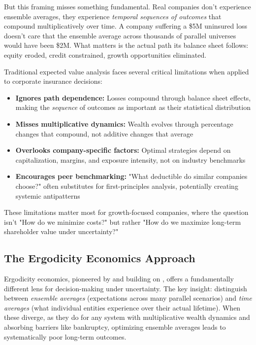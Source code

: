 \documentclass[11pt,letterpaper]{article}
\begin{document}
But this framing misses something fundamental. Real companies don't experience ensemble averages, they experience \emph{temporal sequences of outcomes} that compound multiplicatively over time. A company suffering a \$5M uninsured loss doesn't care that the ensemble average across thousands of parallel universes would have been \$2M. What matters is the actual path its balance sheet follows: equity eroded, credit constrained, growth opportunities eliminated.

Traditional expected value analysis faces several critical limitations when applied to corporate insurance decisions:
\begin{itemize}
    \item \textbf{Ignores path dependence:} Losses compound through balance sheet effects, making the \emph{sequence} of outcomes as important as their statistical distribution
    \item \textbf{Misses multiplicative dynamics:} Wealth evolves through percentage changes that compound, not additive changes that average
    \item \textbf{Overlooks company-specific factors:} Optimal strategies depend on capitalization, margins, and exposure intensity, not on industry benchmarks
    \item \textbf{Encourages peer benchmarking:} "What deductible do similar companies choose?" often substitutes for first-principles analysis, potentially creating systemic antipatterns
\end{itemize}

These limitations matter most for growth-focused companies, where the question isn't "How do we minimize costs?" but rather "How do we maximize long-term shareholder value under uncertainty?"

\subsection{The Ergodicity Economics Approach}

Ergodicity economics, pioneered by \citet{peters2019ergodicity} and building on \citet{kelly1956new}, offers a fundamentally different lens for decision-making under uncertainty. The key insight: distinguish between \emph{ensemble averages} (expectations across many parallel scenarios) and \emph{time averages} (what individual entities experience over their actual lifetime). When these diverge, as they do for any system with multiplicative wealth dynamics and absorbing barriers like bankruptcy, optimizing ensemble averages leads to systematically poor long-term outcomes.
\end{document}
